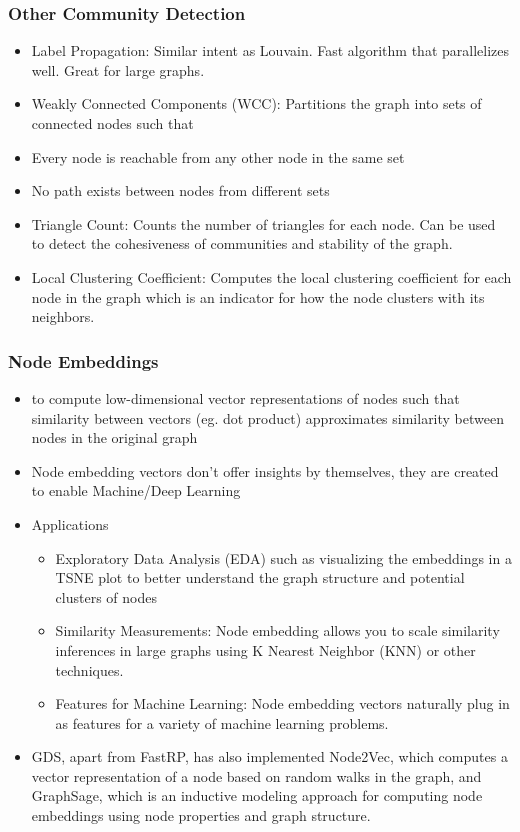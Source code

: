 \begin{frame}[fragile]\frametitle{Other Community Detection}

 
 \begin{itemize}
\item Label Propagation: Similar intent as Louvain. Fast algorithm that parallelizes well. Great for large graphs.
\item Weakly Connected Components (WCC): Partitions the graph into sets of connected nodes such that
\item Every node is reachable from any other node in the same set
\item No path exists between nodes from different sets
\item Triangle Count: Counts the number of triangles for each node. Can be used to detect the cohesiveness of communities and stability of the graph.
\item Local Clustering Coefficient: Computes the local clustering coefficient for each node in the graph which is an indicator for how the node clusters with its neighbors.
\end{itemize}

\end{frame}

\begin{frame}[fragile]\frametitle{Node Embeddings}

\begin{itemize}
\item to compute low-dimensional vector representations of nodes such that similarity between vectors (eg. dot product) approximates similarity between nodes in the original graph
\item Node embedding vectors don’t offer insights by themselves, they are created to enable Machine/Deep Learning
\item Applications
	\begin{itemize}
	\item Exploratory Data Analysis (EDA) such as visualizing the embeddings in a TSNE plot to better understand the graph structure and potential clusters of nodes
	\item Similarity Measurements: Node embedding allows you to scale similarity inferences in large graphs using K Nearest Neighbor (KNN) or other techniques.
	\item Features for Machine Learning: Node embedding vectors naturally plug in as features for a variety of machine learning problems. 
	\end{itemize}
\item GDS, apart from FastRP, has also implemented Node2Vec, which computes a vector representation of a node based on random walks in the graph, and GraphSage, which is an inductive modeling approach for computing node embeddings using node properties and graph structure.	
\end{itemize}

\end{frame}

